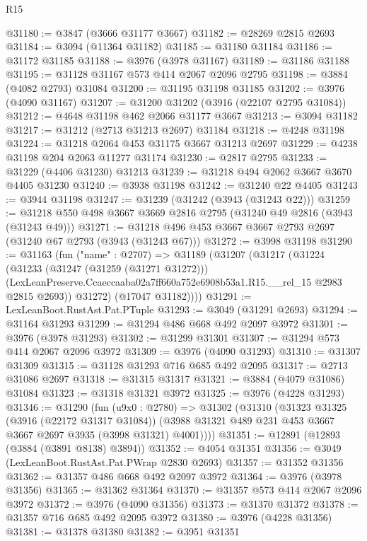 \begin{lexlean}{R15}
\begin{coremodule}
@31180 := @3847 (@3666 @31177 @3667)
@31182 := @28269 @2815 @2693
@31184 := @3094 (@11364 @31182)
@31185 := @31180 @31184
@31186 := @31172 @31185
@31188 := @3976 (@3978 @31167)
@31189 := @31186 @31188
@31195 := @31128 @31167 @573 @414 @2067 @2096 @2795
@31198 := @3884 (@4082 @2793) @31084
@31200 := @31195 @31198 @31185
@31202 := @3976 (@4090 @31167)
@31207 := @31200 @31202 (@3916 (@22107 @2795 @31084))
@31212 := @4648 @31198 @462 @2066 @31177 @3667
@31213 := @3094 @31182
@31217 := @31212 (@2713 @31213 @2697) @31184
@31218 := @4248 @31198
@31224 := @31218 @2064 @453 @31175 @3667 @31213 @2697
@31229 := @4238 @31198 @204 @2063 @11277 @31174
@31230 := @2817 @2795
@31233 := @31229 (@4406 @31230) @31213
@31239 := @31218 @494 @2062 @3667 @3670 @4405 @31230
@31240 := @3938 @31198
@31242 := @31240 @22 @4405
@31243 := @3944 @31198
@31247 := @31239 (@31242 (@3943 (@31243 @22)))
@31259 := @31218 @550 @498 @3667 @3669 @2816 @2795 (@31240 @49 @2816 (@3943 (@31243 @49)))
@31271 := @31218 @496 @453 @3667 @3667 @2793 @2697 (@31240 @67 @2793 (@3943 (@31243 @67)))
@31272 := @3998 @31198
@31290 := @31163
    (fun ("name" : @2707) =>
    @31189
      (@31207
        (@31217
          (@31224
            (@31233
              (@31247 (@31259 (@31271 @31272)))
              (LexLeanPreserve.Ccaeccaaba02a7ff660a752e6908b53a1.R15.__rel_15 @2983 @2815 @2693))
            @31272)
          (@17047 @31182))))
@31291 := LexLeanBoot.RustAst.Pat.PTuple
@31293 := @3049 (@31291 @2693)
@31294 := @31164 @31293
@31299 := @31294 @486 @668 @492 @2097 @3972
@31301 := @3976 (@3978 @31293)
@31302 := @31299 @31301
@31307 := @31294 @573 @414 @2067 @2096 @3972
@31309 := @3976 (@4090 @31293)
@31310 := @31307 @31309
@31315 := @31128 @31293 @716 @685 @492 @2095
@31317 := @2713 @31086 @2697
@31318 := @31315 @31317
@31321 := @3884 (@4079 @31086) @31084
@31323 := @31318 @31321 @3972
@31325 := @3976 (@4228 @31293)
@31346 := @31290
    (fun (u9x0 : @2780) =>
    @31302
      (@31310
        (@31323
          @31325
          (@3916 (@22172 @31317 @31084))
          (@3988 @31321 @489 @231 @453 @3667 @3667 @2697 @3935 (@3998 @31321) @4001))))
@31351 := @12891 (@12893 (@3884 (@3891 @8138) @3894))
@31352 := @4054 @31351
@31356 := @3049 (LexLeanBoot.RustAst.Pat.PWrap @2830 @2693)
@31357 := @31352 @31356
@31362 := @31357 @486 @668 @492 @2097 @3972
@31364 := @3976 (@3978 @31356)
@31365 := @31362 @31364
@31370 := @31357 @573 @414 @2067 @2096 @3972
@31372 := @3976 (@4090 @31356)
@31373 := @31370 @31372
@31378 := @31357 @716 @685 @492 @2095 @3972
@31380 := @3976 (@4228 @31356)
@31381 := @31378 @31380
@31382 := @3951 @31351

\end{coremodule}
\end{lexlean}
